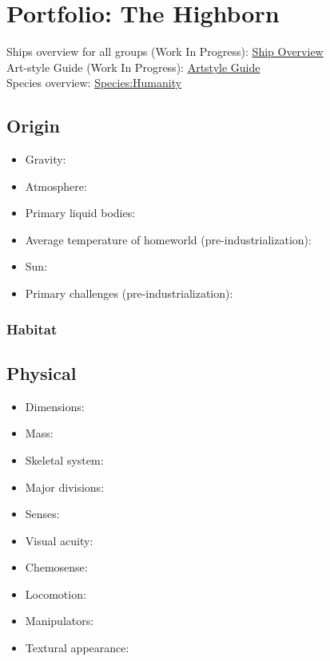 \section{Portfolio: The Highborn}
Ships overview for all groups (Work In Progress): \href{http://vegastrike.sourceforge.net/wiki/Artstyle\_guide:Overview\_Guide}{Ship Overview} \\
Art-style Guide (Work In Progress): \href{http://vegastrike.sourceforge.net/wiki/Artstyle\_guide:Highborn}{Artstyle Guide} \\
Species overview: \href{http://vegastrike.sourceforge.net/wiki/Species:Humanity}{Species:Humanity} \\

\subsection{Origin}
\begin{itemize}
\item Gravity: 

\item Atmosphere: 

\item Primary liquid bodies: 

\item Average temperature of homeworld (pre-industrialization):

\item Sun: 

\item Primary challenges (pre-industrialization): 
\end{itemize}


\subsubsection{Habitat}

\subsection{Physical}
\begin{itemize}
\item Dimensions: 

\item Mass: 

\item Skeletal system: 

\item Major divisions: 

\item Senses: 

\item Visual acuity: 

\item Chemosense: 

\item Locomotion: 

\item Manipulators: 

\item Textural appearance: 
\end{itemize}

